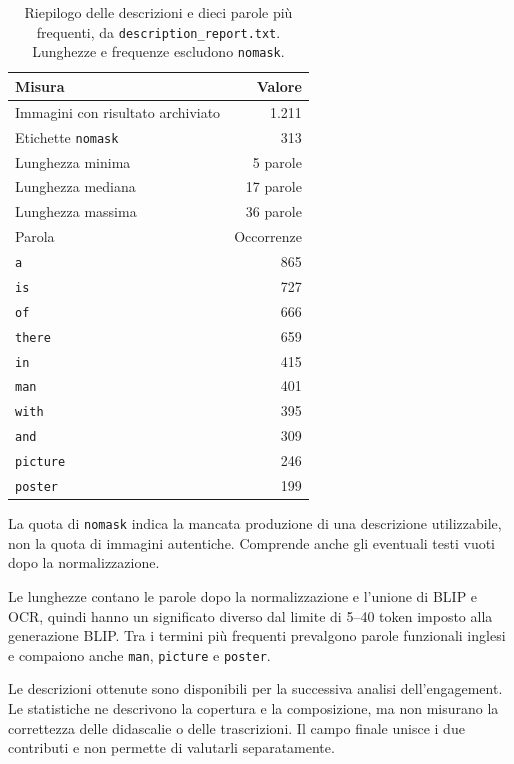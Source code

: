\begin{table}[htbp]
    \centering
    \small
    \caption{Riepilogo delle descrizioni e dieci parole più frequenti, da \texttt{description\_report.txt}. Lunghezze e frequenze escludono \texttt{nomask}.}
    \label{tab:risultati-descrizioni}
    \begin{tabular}{@{}lr@{}}
        \toprule
        Misura & Valore \\
        \midrule
        Immagini con risultato archiviato & 1.211 \\
        Etichette \texttt{nomask} & 313 \\
        Lunghezza minima & 5 parole \\
        Lunghezza mediana & 17 parole \\
        Lunghezza massima & 36 parole \\
        \midrule
        Parola & Occorrenze \\
        \midrule
        \texttt{a} & 865 \\
        \texttt{is} & 727 \\
        \texttt{of} & 666 \\
        \texttt{there} & 659 \\
        \texttt{in} & 415 \\
        \texttt{man} & 401 \\
        \texttt{with} & 395 \\
        \texttt{and} & 309 \\
        \texttt{picture} & 246 \\
        \texttt{poster} & 199 \\
        \bottomrule
    \end{tabular}
\end{table}

La quota di \texttt{nomask} indica la mancata produzione di una descrizione utilizzabile, non la quota di immagini autentiche. Comprende anche gli eventuali testi vuoti dopo la normalizzazione.

Le lunghezze contano le parole dopo la normalizzazione e l'unione di BLIP e OCR, quindi hanno un significato diverso dal limite di 5--40 token imposto alla generazione BLIP. Tra i termini più frequenti prevalgono parole funzionali inglesi e compaiono anche \texttt{man}, \texttt{picture} e \texttt{poster}.

Le descrizioni ottenute sono disponibili per la successiva analisi dell'engagement. Le statistiche ne descrivono la copertura e la composizione, ma non misurano la correttezza delle didascalie o delle trascrizioni. Il campo finale unisce i due contributi e non permette di valutarli separatamente.

